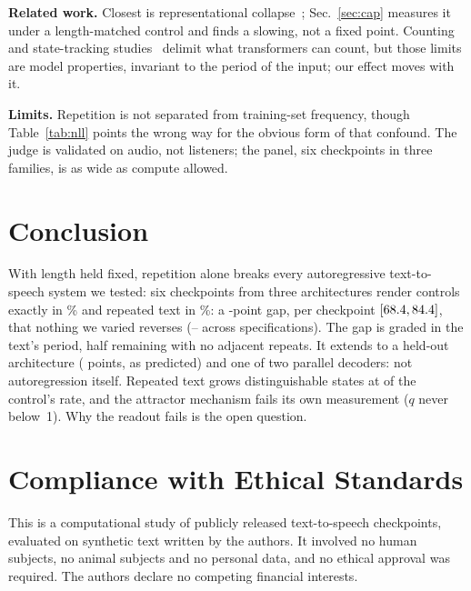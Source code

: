 \documentclass{article}
\newcommand{\tabsize}{\small}
\begin{document}
\textbf{Related work.}
Closest is representational collapse~\cite{barbero2024glasses};
Sec.~\ref{sec:cap} measures it under a length-matched control and finds a
slowing, not a fixed point. Counting and state-tracking
studies~\cite{yehudai2024when,salzer2025counting,zhang2024counting,%
hahn2020theoretical,strobl2024formal,li2025statetracking} delimit what transformers can count, but those limits are model
properties, invariant to the period of the input; our effect moves with
it.

\textbf{Limits.}
Repetition is not separated from training-set
frequency, though Table~\ref{tab:nll} points the wrong way for the
obvious form of that confound. The judge is
validated on audio, not listeners; the panel, six checkpoints in three
families, is as wide as compute allowed.

\section{Conclusion}
\label{sec:conclusion}

With length held fixed, repetition alone breaks every autoregressive
text-to-speech system we tested: six checkpoints from three architectures
render controls exactly in \ExactCtl{}\% and
repeated text in \ExactRep{}\%: a \ARPoolGap{}-point
gap, per checkpoint \CkExact{} $[68.4{},84.4{}]$, that
nothing we varied reverses (\SpecLo{}--\SpecHi{} across \SpecN{}
specifications). The gap is graded in the text's period, half
remaining with no adjacent repeats. It extends to a held-out architecture
(\CosyGap{} points, as predicted) and one of two parallel decoders: not
autoregression itself. Repeated text grows distinguishable states at
\CapRatio{} of the control's rate, and the attractor mechanism fails its
own measurement ($q$ never below~1). Why the readout fails is the
open question.

\section*{Compliance with Ethical Standards}
This is a computational study of publicly released text-to-speech
checkpoints, evaluated on synthetic text written by the authors. It
involved no human subjects, no animal subjects and no personal data, and
no ethical approval was required. The authors declare no competing
financial interests.


\let\oldthebibliography\thebibliography
\renewcommand{\thebibliography}[1]{%
  \oldthebibliography{#1}%
  \setlength{\itemsep}{0pt}%
  \setlength{\parsep}{0pt}%
  \setlength{\parskip}{0pt}}
\balance   %
{\tabsize

}
\end{document}
